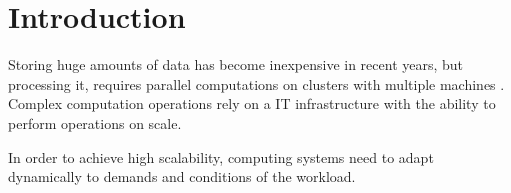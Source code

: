 \chapter{Introduction}
\label{sec:introduction}
%




Storing huge amounts of data has become inexpensive in recent years, but processing it, requires 
parallel computations on clusters with multiple machines \cite{Chambers2018Spark}. Complex 
computation operations rely on a IT infrastructure with the ability to perform operations on scale. 

In order to achieve high scalability, computing systems need to adapt dynamically to demands and conditions of the workload.




